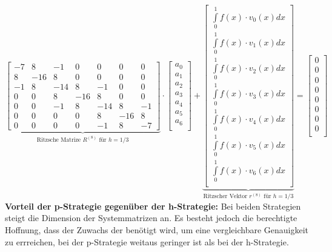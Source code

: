 $\underset{\text{Ritzsche Matrize $R^{(8)}$ für } h=1/3}{\underbrace{\begin{bmatrix}
				-7 & 8   & -1  & 0   & 0   & 0   & 0  \\
				8  & -16 & 8   & 0   & 0   & 0   & 0  \\
				-1 & 8   & -14 & 8   & -1  & 0   & 0  \\
				0  & 0   & 8   & -16 & 8   & 0   & 0  \\
				0  & 0   & -1  & 8   & -14 & 8   & -1 \\
				0  & 0   & 0   & 0   & 8   & -16 & 8  \\
				0  & 0   & 0   & 0   & -1  & 8   & -7
			\end{bmatrix}}}\cdot\begin{bmatrix}
		a_0 \\
		a_1 \\
		a_2 \\
		a_3 \\
		a_4 \\
		a_5 \\
		a_6 \\
	\end{bmatrix}
	+\underset{\text{Ritzscher Vektor $r^{(8)}$ für } h=1/3}{\underbrace{\begin{bmatrix}
				\int\limits_{0}^{1}{f(x)\cdot v_0(x)dx} \\
				\int\limits_{0}^{1}{f(x)\cdot v_1(x)dx} \\
				\int\limits_{0}^{1}{f(x)\cdot v_2(x)dx} \\
				\int\limits_{0}^{1}{f(x)\cdot v_3(x)dx} \\
				\int\limits_{0}^{1}{f(x)\cdot v_4(x)dx} \\
				\int\limits_{0}^{1}{f(x)\cdot v_5(x)dx} \\
				\int\limits_{0}^{1}{f(x)\cdot v_6(x)dx} \\
			\end{bmatrix}}}=
	\begin{bmatrix}
		0 \\
		0 \\
		0 \\
		0 \\
		0 \\
		0 \\
		0 \\
		0 \\
	\end{bmatrix}
$\\

\textbf{Vorteil der p-Strategie gegenüber der h-Strategie:} Bei beiden Strategien steigt die Dimension der Systemmatrizen an. Es besteht jedoch die berechtigte Hoffnung, dass der Zuwachs der benötigt wird, um eine vergleichbare Genauigkeit zu errreichen, bei der p-Strategie weitaus geringer ist als bei der h-Strategie.

